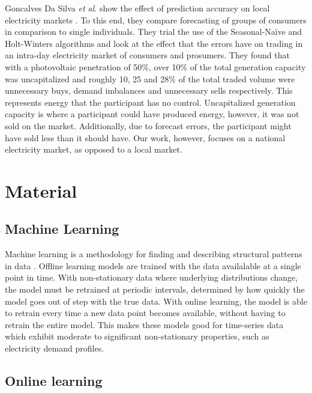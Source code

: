 \documentclass[final,3p,times,twocolumn,numbers]{elsarticle}
\begin{document}
Goncalves Da Silva \textit{et al}. show the effect of prediction accuracy on local electricity markets \cite{GoncalvesDaSilva2014}. To this end, they compare forecasting of groups of consumers in comparison to single individuals. They trial the use of the Seasonal-Naïve and Holt-Winters algorithms and look at the effect that the errors have on trading in an intra-day electricity market of consumers and prosumers. They found that with a photovoltaic penetration of 50\%, over 10\% of the total generation capacity was uncapitalized and roughly 10, 25 and 28\% of the total traded volume were unnecessary buys, demand imbalances and unnecessary sells respectively. This represents energy that the participant has no control. Uncapitalized generation capacity is where a participant could have produced energy, however, it was not sold on the market. Additionally, due to forecast errors, the participant might have sold less than it should have. Our work, however, focuses on a national electricity market, as opposed to a local market.





\section{Material}
\label{sec:material}

\subsection{Machine Learning}

Machine learning is a methodology for finding and describing structural patterns in data \cite{Witten2011}. Offline learning models are trained with the data availalable at a single point in time. With non-stationary data where underlying distributions change, the model must be retrained at periodic intervals, determined by how quickly the model goes out of step with the true data. With online learning, the model is able to retrain every time a new data point becomes available, without having to retrain the entire model. This makes these models good for time-series data which exhibit moderate to significant non-stationary properties, such as electricity demand profiles.





\subsection{Online learning}
\end{document}
